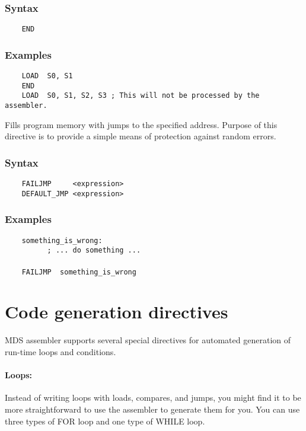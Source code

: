     \subsubsection{Syntax}
        \verb'    END'

    \subsubsection{Examples}
        \verb'    LOAD  S0, S1'\\
        \verb'    END'\\
        \verb'    LOAD  S0, S1, S2, S3 ; This will not be processed by the assembler.'

    Fills program memory with jumps to the specified address. Purpose of this directive is to provide a simple means of protection against random errors.

    \subsubsection{Syntax}
        \verb'    FAILJMP     <expression>'\\
        \verb'    DEFAULT_JMP <expression>'

    \subsubsection{Examples}
        \verb'    something_is_wrong:'\\
        \verb'          ; ... do something ...'\\
        \verb''\\
        \verb'    FAILJMP  something_is_wrong'

\clearpage
\section{Code generation directives}
    MDS assembler supports several special directives for automated generation of run-time loops and conditions.

    \paragraph{Loops:} Instead of writing loops with loads, compares, and jumps, you might find it to be more straightforward to use the assembler to generate them for you. You can use three types of FOR loop and one type of WHILE loop.

